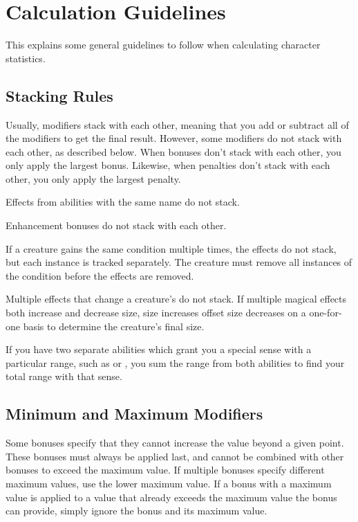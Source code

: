 \section{Calculation Guidelines}
  This explains some general guidelines to follow when calculating character statistics.

  \subsection{Stacking Rules}\label{Stacking Rules}
    Usually, modifiers stack with each other, meaning that you add or subtract all of the modifiers to get the final result.
    However, some modifiers do not stack with each other, as described below.
    When bonuses don't stack with each other, you only apply the largest bonus.
    Likewise, when penalties don't stack with each other, you only apply the largest penalty.

    \begin{raggeditemize}
      \item Effects from abilities with the same name do not stack.
      \item Enhancement bonuses do not stack with each other.
      \item If a creature gains the same condition multiple times, the effects do not stack, but each instance is tracked separately.
        The creature must remove all instances of the condition before the effects are removed.
      \item Multiple \magical effects that change a creature's  do not stack.
        If multiple magical effects both increase and decrease size, size increases offset size decreases on a one-for-one basis to determine the creature's final size.
      \item If you have two separate abilities which grant you a special sense with a particular range, such as  or , you sum the range from both abilities to find your total range with that sense.
    \end{raggeditemize}

  \subsection{Minimum and Maximum Modifiers}\label{Minimum and Maximum Modifiers}
    Some bonuses specify that they cannot increase the value beyond a given point.
    These bonuses must always be applied last, and cannot be combined with other bonuses to exceed the maximum value.
    If multiple bonuses specify different maximum values, use the lower maximum value.
    If a bonus with a maximum value is applied to a value that already exceeds the maximum value the bonus can provide, simply ignore the bonus and its maximum value.

